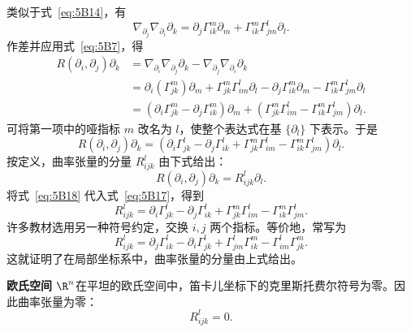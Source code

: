 类似于式~\eqref{eq:5B14}，有
\begin{equation*}
  \nabla_{\partial_j}\nabla_{\partial_i}\partial_k
     =\partial_j\Gamma^m_{ik}\partial_m+\Gamma^m_{ik}\Gamma^l_{jm}\partial_l.
  \tag{5B15}\label{eq:5B15}
\end{equation*}
作差并应用式~\eqref{eq:5B7}，得
\begin{equation*}
  \begin{aligned}
    R(\partial_i,\partial_j)\partial_k
     &=\nabla_{\partial_i}\nabla_{\partial_j}\partial_k
       -\nabla_{\partial_j}\nabla_{\partial_i}\partial_k\\
     &=\partial_i(\Gamma^m_{jk})\partial_m+\Gamma^m_{jk}\Gamma^l_{im}\partial_l
       -\partial_j\Gamma^m_{ik}\partial_m-\Gamma^m_{ik}\Gamma^l_{jm}\partial_l\\
     &=(\partial_i\Gamma^m_{jk}-\partial_j\Gamma^m_{ik})\partial_m
        +(\Gamma^m_{jk}\Gamma^l_{im}-\Gamma^m_{ik}\Gamma^l_{jm})\partial_l.
  \end{aligned}
  \tag{5B16}\label{eq:5B16}
\end{equation*}
可将第一项中的哑指标 $m$ 改名为 $l$，使整个表达式在基 $\{\partial_l\}$ 下表示。于是
\begin{equation*}
  R(\partial_i,\partial_j)\partial_k
     =(\partial_i\Gamma^l_{jk}-\partial_j\Gamma^l_{ik}
        +\Gamma^m_{jk}\Gamma^l_{im}-\Gamma^m_{ik}\Gamma^l_{jm})\partial_l.
  \tag{5B17}\label{eq:5B17}
\end{equation*}
按定义，曲率张量的分量 $R^l_{ijk}$ 由下式给出：
\begin{equation*}
  R(\partial_i,\partial_j)\partial_k=R^l_{ijk}\partial_l.
  \tag{5B18}\label{eq:5B18}
\end{equation*}
将式~\eqref{eq:5B18} 代入式~\eqref{eq:5B17}，得到
\begin{equation*}
  R^l_{ijk}=\partial_i\Gamma^l_{jk}-\partial_j\Gamma^l_{ik}
        +\Gamma^m_{jk}\Gamma^l_{im}-\Gamma^m_{ik}\Gamma^l_{jm}.
  \tag{5B19}\label{eq:5B19}
\end{equation*}
许多教材选用另一种符号约定，交换 $i,j$ 两个指标。等价地，常写为
\begin{equation*}
  R^l_{ijk}=\partial_j\Gamma^l_{ik}-\partial_i\Gamma^l_{jk}
        +\Gamma^l_{jm}\Gamma^m_{ik}-\Gamma^l_{im}\Gamma^m_{jk}.
  \tag{5B20}\label{eq:5B20}
\end{equation*}
这就证明了在局部坐标系中，曲率张量的分量由上式给出。

\textbf{欧氏空间 $\R^n$}\quad 在平坦的欧氏空间中，笛卡儿坐标下的克里斯托费尔符号为零。因此曲率张量为零：
\[
  R^l_{ijk}=0.
\]

